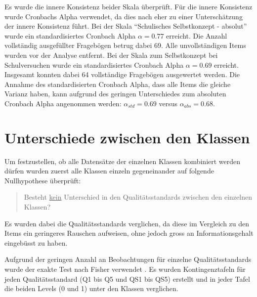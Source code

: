 \label{txt:Cronbach}
Es wurde die innere Konsistenz beider Skala überprüft. Für die innere Konsistenz wurde Cronbachs Alpha verwendet, da dies nach \citet{Eisinga2013} eher zu einer Unterschätzung der innere Konsistenz führt. Bei der Skala "`Schulisches Selbstkonzept - absolut"' wurde ein standardisiertes Cronbach Alpha $\alpha=0.77$  erreicht. Die Anzahl vollständig ausgefüllter Fragebögen betrug dabei 69. Alle unvollständigen Items wurden vor der Analyse entfernt. Bei der Skala zum Selbstkonzept bei Schulversuchen wurde ein standardisiertes Cronbach Alpha $\alpha = 0.69$ erreicht. Insgesamt konnten dabei 64 vollständige Fragebögen ausgewertet werden. Die Annahme des standardisierten Cronbach Alpha, dass alle Items die gleiche Varianz haben, kann aufgrund des geringen Unterschiedes zum absoluten Cronbach Alpha angenommen werden: $\alpha_{std} = 0.69$ versus $\alpha_{abs} = 0.68$.


\section{Unterschiede zwischen den Klassen}

Um festzustellen, ob alle Datensätze der einzelnen Klassen kombiniert werden dürfen wurden zuerst alle Klassen einzeln gegeneinander auf folgende Nullhypothese überprüft: 
\begin{quote}
Besteht \underline{kein} Unterschied in den Qualitätsstandards zwischen den einzelnen Klassen?
\end{quote}
Es wurden dabei die Qualitätsstandards verglichen, da diese im Vergleich zu den Items ein geringeres Rauschen aufweisen, ohne jedoch gross an Informationsgehalt eingebüsst zu haben.


Aufgrund der geringen Anzahl an Beobachtungen für einzelne Qualitätsstandards wurde der exakte Test nach Fisher verwendet \citep{Fisher1922}. Es wurden Kontingenztafeln für jeden Qualitätsstandard (Q1 bis Q5 und QS1 bis QS5) erstellt und in jeder Tafel die beiden Levels (0 und 1) unter den Klassen verglichen.


